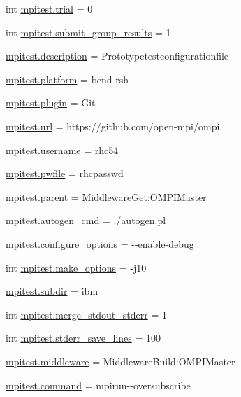 \begin{DoxyCompactItemize}
\item 
int \hyperlink{namespacempitest_aa0f43e6283b3889679e6631336f043d1}{mpitest.\-trial} = 0
\item 
int \hyperlink{namespacempitest_ac471d6a27e0973ff2ca6b08b1709963d}{mpitest.\-submit\-\_\-group\-\_\-results} = 1
\item 
\hyperlink{namespacempitest_ab3988561c8669a528d164bb087dfaba8}{mpitest.\-description} = Prototypetestconfigurationfile
\item 
\hyperlink{namespacempitest_aa707f637f52c6a7d6e9269de9fa926d3}{mpitest.\-platform} = bend-\/rsh
\item 
\hyperlink{namespacempitest_ad3586f81f11a42b438f3a012d4c2bf4e}{mpitest.\-plugin} = Git
\item 
\hyperlink{namespacempitest_aae573db72acd85d3ee46589c81be2d37}{mpitest.\-url} = https\-://github.\-com/open-\/mpi/ompi
\item 
\hyperlink{namespacempitest_a862f2676bbe33c7059e3a136b4b96ddc}{mpitest.\-username} = rhc54
\item 
\hyperlink{namespacempitest_a4d126335ef307f44645da8ff58e86927}{mpitest.\-pwfile} = rhcpasswd
\item 
\hyperlink{namespacempitest_afea79525dcdc90bf190e1fd794ba7377}{mpitest.\-parent} = Middleware\-Get\-:\-O\-M\-P\-I\-Master
\item 
\hyperlink{namespacempitest_a216b951ce28d23d25761486f09fdafa5}{mpitest.\-autogen\-\_\-cmd} = ./autogen.\-pl
\item 
\hyperlink{namespacempitest_ac530ff92b31cfd595a3fc3c3a82d7fc6}{mpitest.\-configure\-\_\-options} = -\/-\/enable-\/debug
\item 
int \hyperlink{namespacempitest_a59b1db518516dae2b5daace949760505}{mpitest.\-make\-\_\-options} = -\/j10
\item 
\hyperlink{namespacempitest_adb11b85868ea4bb66346873247ae5eee}{mpitest.\-subdir} = ibm
\item 
int \hyperlink{namespacempitest_a458e434e47470db96ce5fd267a120b69}{mpitest.\-merge\-\_\-stdout\-\_\-stderr} = 1
\item 
int \hyperlink{namespacempitest_a359e155a689c5604a331d2450976d0fa}{mpitest.\-stderr\-\_\-save\-\_\-lines} = 100
\item 
\hyperlink{namespacempitest_abda8feed4cda165ed145590c0c693826}{mpitest.\-middleware} = Middleware\-Build\-:\-O\-M\-P\-I\-Master
\item 
\hyperlink{namespacempitest_a47e2cc8f7e7a5ee1717d68777fd3c363}{mpitest.\-command} = mpirun-\/-\/oversubscribe

\end{DoxyCompactItemize}
